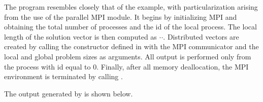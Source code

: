 The  program resembles closely that of the  example, with
particularization arising from the use of the parallel MPI {\nvecp} module.
It begins by initializing MPI and obtaining the total number of processes and 
the id of the local process. The local length of the solution vector is then 
computed as $\cdot$$\cdot$.
Distributed vectors are created by calling the constructor defined in {\nvecp}
with the MPI communicator and the local and global problem sizes as arguments.
All output is performed only from the process with id equal to $0$.
Finally, after all memory deallocation, the MPI environment is terminated by
calling .

The output generated by  is shown below.



